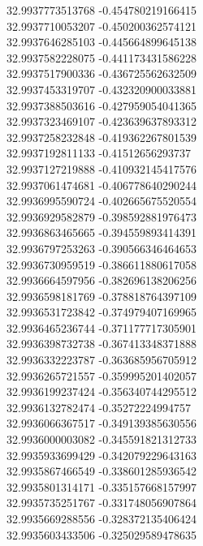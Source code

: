 {32.9937773513768	-0.454780219166415\\
32.9937710053207	-0.450200362574121\\
32.9937646285103	-0.445664899645138\\
32.9937582228075	-0.441173431586228\\
32.9937517900336	-0.436725562632509\\
32.9937453319707	-0.432320900033881\\
32.9937388503616	-0.427959054041365\\
32.9937323469107	-0.423639637893312\\
32.9937258232848	-0.419362267801539\\
32.9937192811133	-0.41512656293737\\
32.9937127219888	-0.410932145417576\\
32.9937061474681	-0.406778640290244\\
32.9936995590724	-0.402665675520554\\
32.9936929582879	-0.398592881976473\\
32.9936863465665	-0.394559893414391\\
32.9936797253263	-0.390566346464653\\
32.9936730959519	-0.386611880617058\\
32.9936664597956	-0.382696138206256\\
32.9936598181769	-0.378818764397109\\
32.9936531723842	-0.374979407169965\\
32.9936465236744	-0.371177717305901\\
32.9936398732738	-0.367413348371888\\
32.9936332223787	-0.363685956705912\\
32.9936265721557	-0.359995201402057\\
32.9936199237424	-0.356340744295512\\
32.9936132782474	-0.35272224994757\\
32.9936066367517	-0.349139385630556\\
32.9936000003082	-0.345591821312733\\
32.9935933699429	-0.342079229643163\\
32.9935867466549	-0.338601285936542\\
32.9935801314171	-0.335157668157997\\
32.9935735251767	-0.331748056907864\\
32.9935669288556	-0.328372135406424\\
32.9935603433506	-0.325029589478635\\
}
